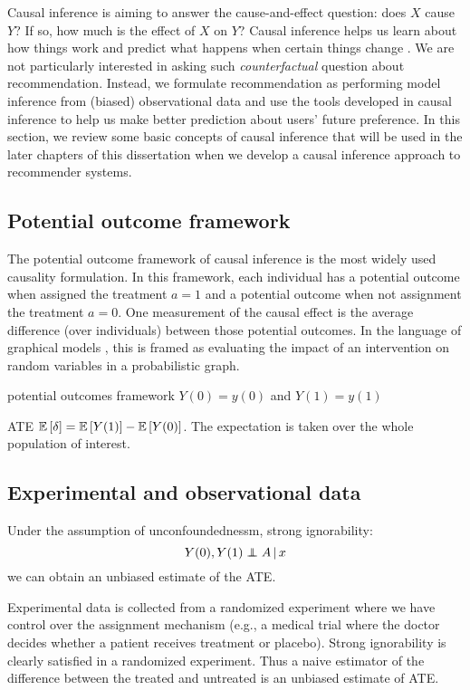 Causal inference is aiming to answer the cause-and-effect question: does $X$ cause $Y$? If so, how much is the effect of $X$ on $Y$? Causal inference helps us learn about how things work and predict what happens when certain things change \citep{morgan2014counterfactuals,imbens2015causal}. We are not particularly interested in asking such \textit{counterfactual} question about recommendation. Instead, we formulate recommendation as performing model inference from (biased) observational data and use the tools developed in causal inference to help us make better prediction about users' future preference. In this section, we review some basic concepts of causal inference that will be used in the later chapters of this dissertation when we develop a causal inference approach to recommender systems.  

\subsection{Potential outcome framework}

The potential outcome framework of causal inference \citep{rubin1974ece} is the most widely used causality formulation. In this framework, each individual has a potential outcome when assigned the treatment $a = 1$ and a potential
outcome when not assignment the treatment $a = 0$. One measurement of the causal effect is the average difference (over individuals) between those potential outcomes. In the language of graphical models \citep{pearl2009causality},
this is framed as evaluating the impact of an intervention on random variables in a probabilistic graph. 

\PP potential outcomes framework \citep{rubin1974ece} $Y(0) = y(0)$ and $Y(1) = y(1)$

\PP \gls{ATE} $\mathbb{E}\left[\delta\right] = \mathbb{E}\left[Y(1)\right] - \mathbb{E}\left[Y(0)\right]$. The expectation is taken over the whole population of interest. 

\subsection{Experimental and observational data}

\PP Under the assumption of unconfoundednessm, strong ignorability:
\begin{equation*}
Y(0), Y(1) \indpt A \g x
\end{equation*}
we can obtain an unbiased estimate of the \gls{ATE}.

\PP Experimental data is collected from a randomized experiment where we have control over the assignment mechanism (e.g., a medical trial where the doctor decides whether a patient receives treatment or placebo). Strong ignorability is clearly satisfied in a randomized experiment. Thus a naive estimator of the difference between the treated and untreated is an unbiased estimate of \gls{ATE}. 

